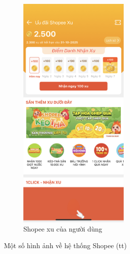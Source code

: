 \begin{figure}[H]
\begin{subfigure}[b]{0.4\textwidth}
        \includegraphics[width=0.6\textwidth]{Shopee_coins.PNG}
        \caption{Shopee xu của người dùng}
    \end{subfigure}
    \caption{Một số hình ảnh về hệ thống Shopee (tt)}
\end{figure}
